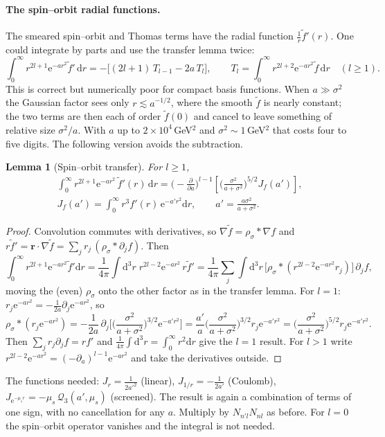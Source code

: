 \documentclass[11pt,a4paper]{article}
\numberwithin{equation}{section}
\theoremstyle{definition}
\theoremstyle{plain}
\newtheorem{lemma}[definition]{Lemma}
\theoremstyle{remark}
\numberwithin{algorithm}{section}
\newcommand{\vr}{\bm r}
\newcommand{\dd}{\mathrm{d}}
\newcommand{\ee}{\mathrm{e}}
\newcommand{\mus}{\mu_s}
\begin{document}
\paragraph{The spin--orbit radial functions.} The smeared spin--orbit and Thomas terms have the radial function $\frac1r\tilde f'(r)$. One could integrate by parts and use the transfer lemma twice:
\[
\int_0^\infty r^{2l+1}\ee^{-ar^2}\tilde f'\,\dd r=-\Big[(2l+1)\,T_{l-1}-2a\,T_l\Big],\qquad T_l=\int_0^\infty r^{2l+2}\ee^{-ar^2}\tilde f\,\dd r\quad(l\ge1).
\]
This is correct but numerically poor for compact basis functions. When $a\gg\sigma^2$ the Gaussian factor sees only $r\lesssim a^{-1/2}$, where the smooth $\tilde f$ is nearly constant; the two terms are then each of order $\tilde f(0)$ and cancel to leave something of relative size $\sigma^2/a$. With $a$ up to $2\times10^4\,$GeV$^2$ and $\sigma^2\sim1\,$GeV$^2$ that costs four to five digits. The following version avoids the subtraction.
\begin{lemma}[Spin--orbit transfer]
For $l\ge1$,
\begin{equation}
\begin{gathered}
\int_0^\infty r^{2l+1}\ee^{-ar^2}\,\tilde f'(r)\,\dd r=\Big(-\frac{\partial}{\partial a}\Big)^{l-1}\left[\Big(\frac{\sigma^2}{a+\sigma^2}\Big)^{5/2}J_f(a')\right],\\
J_f(a')=\int_0^\infty r^3f'(r)\,\ee^{-a'r^2}\dd r,\qquad a'=\frac{a\sigma^2}{a+\sigma^2}.
\end{gathered}
\label{eq:sotransfer}
\end{equation}
\end{lemma}
\begin{proof}
Convolution commutes with derivatives, so $\nabla\tilde f=\rho_\sigma*\nabla f$ and $r\tilde f'=\vr\cdot\nabla\tilde f=\sum_jr_j\,(\rho_\sigma*\partial_jf)$. Then
\[
\int_0^\infty r^{2l+1}\ee^{-ar^2}\tilde f'\dd r=\frac1{4\pi}\int\dd^3r\;r^{2l-2}\ee^{-ar^2}\,r\tilde f'=\frac1{4\pi}\sum_j\int\dd^3r\,\big[\rho_\sigma*(r^{2l-2}\ee^{-ar^2}r_j)\big]\,\partial_jf ,
\]
moving the (even) $\rho_\sigma$ onto the other factor as in the transfer lemma. For $l=1$: $r_j\ee^{-ar^2}=-\frac1{2a}\partial_j\ee^{-ar^2}$, so
\[
\rho_\sigma*(r_j\ee^{-ar^2})=-\frac1{2a}\,\partial_j\Big[\Big(\frac{\sigma^2}{a+\sigma^2}\Big)^{3/2}\ee^{-a'r^2}\Big]=\frac{a'}{a}\Big(\frac{\sigma^2}{a+\sigma^2}\Big)^{3/2}r_j\ee^{-a'r^2}=\Big(\frac{\sigma^2}{a+\sigma^2}\Big)^{5/2}r_j\ee^{-a'r^2}.
\]
Then $\sum_jr_j\partial_jf=rf'$ and $\frac1{4\pi}\int\dd^3r=\int_0^\infty r^2\dd r$ give the $l=1$ result. For $l>1$ write $r^{2l-2}\ee^{-ar^2}=(-\partial_a)^{l-1}\ee^{-ar^2}$ and take the derivatives outside.
\end{proof}
The functions needed: $J_r=\frac1{2a'^2}$ (linear), $J_{1/r}=-\frac1{2a'}$ (Coulomb), $J_{\ee^{-\mus r}}=-\mus\,\mathcal Q_3(a',\mus)$ (screened). The result is again a combination of terms of one sign, with no cancellation for any $a$. Multiply by $N_{n'l}N_{nl}$ as before. For $l=0$ the spin--orbit operator vanishes and the integral is not needed.
\end{document}
